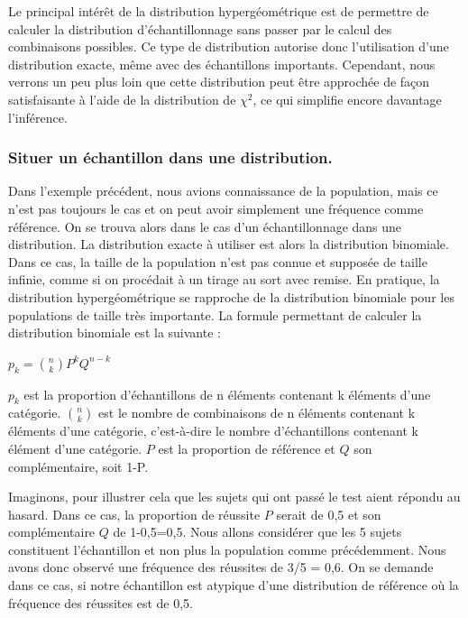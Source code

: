 \documentclass[]{book}
\theoremstyle{definition}
\theoremstyle{definition}
\theoremstyle{definition}
\theoremstyle{remark}
\begin{document}
Le principal intérêt de la distribution hypergéométrique est de
permettre de calculer la distribution d'échantillonnage sans passer par
le calcul des combinaisons possibles. Ce type de distribution autorise
donc l'utilisation d'une distribution exacte, même avec des échantillons
importants. Cependant, nous verrons un peu plus loin que cette
distribution peut être approchée de façon satisfaisante à l'aide de la
distribution de \(\chi^2\), ce qui simplifie encore davantage
l'inférence.

\hypertarget{situer-un-echantillon-dans-une-distribution.}{%
\subsubsection{Situer un échantillon dans une
distribution.}\label{situer-un-echantillon-dans-une-distribution.}}

Dans l'exemple précédent, nous avions connaissance de la population,
mais ce n'est pas toujours le cas et on peut avoir simplement une
fréquence comme référence. On se trouva alors dans le cas d'un
échantillonnage dans une distribution. La distribution exacte à utiliser
est alors la distribution binomiale. Dans ce cas, la taille de la
population n'est pas connue et supposée de taille infinie, comme si on
procédait à un tirage au sort avec remise. En pratique, la distribution
hypergéométrique se rapproche de la distribution binomiale pour les
populations de taille très importante. La formule permettant de calculer
la distribution binomiale est la suivante :

\(p_{k} = \binom{n}{k}P^{k}Q^{n-k}\)

\(p_{k}\) est la proportion d'échantillons de n éléments contenant k
éléments d'une catégorie. \(\binom{n}{k}\) est le nombre de combinaisons
de n éléments contenant k éléments d'une catégorie, c'est-à-dire le
nombre d'échantillons contenant k élément d'une catégorie. \(P\) est la
proportion de référence et \(Q\) son complémentaire, soit 1-P.

Imaginons, pour illustrer cela que les sujets qui ont passé le test
aient répondu au hasard. Dans ce cas, la proportion de réussite \(P\)
serait de 0,5 et son complémentaire \(Q\) de 1-0,5=0,5. Nous allons
considérer que les 5 sujets constituent l'échantillon et non plus la
population comme précédemment. Nous avons donc observé une fréquence des
réussites de 3/5 = 0,6. On se demande dans ce cas, si notre échantillon
est atypique d'une distribution de référence où la fréquence des
réussites est de 0,5.
\end{document}
